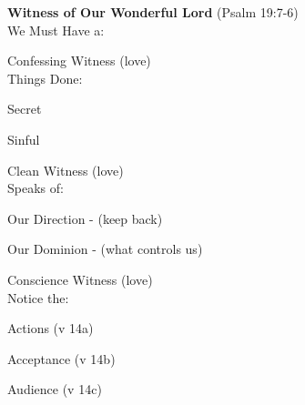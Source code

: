 \begin{compactenum}[I.]
\begin{compactenum}[A.]
	\end{compactenum}
    \item \textbf{Witness of Our Wonderful Lord}   (Psalm 19:7-6) \\We Must Have a:
    \begin{compactenum}[A.]
    	\item Confessing Witness (love)\\Things Done:
    	\begin{compactenum}[1.]
    	    \item Secret
    	    \item Sinful
    	\end{compactenum}
    	\item Clean Witness (love)\\Speaks of:
    	\begin{compactenum}[1.]
    	    \item Our Direction - (keep back)
    	    \item Our Dominion - (what controls us)
    	\end{compactenum}
    	\item Conscience Witness (love)\\Notice the:
    	\begin{compactenum}[1.]
    	    \item Actions (v 14a)
    	    \item Acceptance (v 14b)
    	    \item Audience (v 14c)
    	\end{compactenum}
	\end{compactenum}
\end{compactenum}

